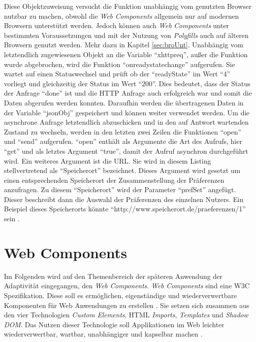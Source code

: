 \documentclass[12pt, paper=a4, bibtotoc, toc=listof, headsepline=true, numbers=endperiod]{scrreprt}
\begin{document}
Diese Objektzuweisung versucht die Funktion unabhängig vom genutzten Browser nutzbar zu machen, obwohl die \emph{Web Components} allgemein nur auf modernen Browsern unterstützt werden. Jedoch können auch \emph{Web Components} unter bestimmten Voraussetzungen und mit der Nutzung von \emph{Polyfills} auch auf älteren Browsern genutzt werden. Mehr dazu in Kapitel \ref{sec:broUnt}. Unabhängig vom letztendlich zugewiesenen Objekt an die Variable \enquote{xhttpreq}, außer die Funktion wurde abgebrochen,  wird die Funktion \enquote{onreadystatechange} aufgerufen. Sie wartet auf einen Statuswechsel und prüft ob der \enquote{readyState} im Wert \enquote{4} vorliegt und gleichzeitig der Status im Wert \enquote{200}. Dies bedeutet, dass der Status der Anfrage \enquote{done} ist und die \ac{HTTP} Anfrage auch erfolgreich war und somit die Daten abgerufen werden konnten. Daraufhin werden die übertragenen Daten in der Variable \enquote{jsonObj} gespeichert und können weiter verwendet werden. Um die asynchrone Anfrage letztendlich abzuschicken und in den auf Antwort wartenden Zustand zu wechseln, werden in den letzten zwei Zeilen die Funktionen \enquote{open} und \enquote{send} aufgerufen. \enquote{open} enthält als Argumente die Art des Aufrufs, hier \enquote{get} und als letztes Argument \enquote{true}, damit der Aufruf asynchron durchgeführt wird. Ein weiteres Argument ist die \ac{URL}. Sie wird in diesem Listing stellvertretend als \enquote{Speicherort} bezeichnet. Dieses Argument wird gesetzt um einen entsprechenden Speicherort der Zusammenstellung der Präferenzen anzufragen. Zu diesem \enquote{Speicherort} wird der Parameter \enquote{prefSet} angefügt. Dieser beschreibt dann die Auswahl der Präferenzen des einzelnen Nutzers. Ein Beispiel dieses Speicherorts könnte \enquote{http://www.speicherort.de/praeferenzen/1} sein \cite{xmlhttp}.
		
\chapter{Web Components}
	Im Folgenden wird auf den Themenbereich der späteren Anwendung der Adaptivität eingegangen, den \emph{Web Components}. \emph{Web Components} sind eine \ac{W3C} Spezifikation. Diese soll es ermöglichen, eigenständige und wiederverwertbare Komponenten für Web Anwendungen zu erstellen \cite[S.1]{patel2015learning}. Sie setzen sich zusammen aus den vier Technologien \emph{Custom Elements}, \ac{HTML} \emph{Imports}, \emph{Templates} und \emph{Shadow \ac{DOM}}. Das Nutzen dieser Technologie soll Applikationen im Web leichter wiederverwertbar, wartbar, unabhängiger und kapselbar machen \cite[S.2]{patel2015learning}.
\end{document}
